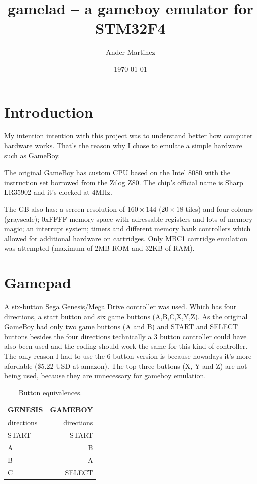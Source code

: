 \documentclass{article}
\title{gamelad -- a gameboy emulator for STM32F4}
\author{Ander Martinez}
\date{\today}
\begin{document}
\maketitle

\section{Introduction}
My intention intention with this project was to understand better
how computer hardware works. That's the reason why I chose to  
emulate a simple hardware such as GameBoy.

The original GameBoy has custom CPU based on the Intel 8080 with
the instruction set borrowed from the Zilog Z80. The chip's official
name is Sharp LR35902 and it's clocked at 4MHz.

The GB also has: a screen resolution of $160 \times 144$
($20 \times 18$ tiles) and four colours (grayscale);
0xFFFF memory space with adressable registers and lots of memory
magic; an interrupt system; timers and different memory bank controllers
which allowed for additional hardware on cartridges. Only MBC1 cartridge
emulation was attempted (maximum of 2MB ROM and 32KB of RAM).

\section{Gamepad}
A six-button Sega Genesis/Mega Drive controller was used.
Which has four directions, a start button and six game buttons
(A,B,C,X,Y,Z).
As the original GameBoy had only two game buttons (A and B) and
START and SELECT buttons besides the four directions technically
a 3 button controller could have also been used and the coding
should work the same for this kind of controller. The only
reason I had to use the 6-button version is because nowadays it's
more afordable (\$5.22 USD at amazon).
The top three buttons (X, Y and Z) are not being used, because
they are unnecessary for gameboy emulation.

\begin{table}[!h]
  \centering
  \begin{tabular}{|l|r|}
    \hline
    GENESIS & GAMEBOY \\
    \hline
    directions & directions \\
    START & START \\
    A & B \\
    B & A \\
    C & SELECT \\
    \hline
  \end{tabular}
  \caption{Button equivalences.}
\end{table}
\end{document}
